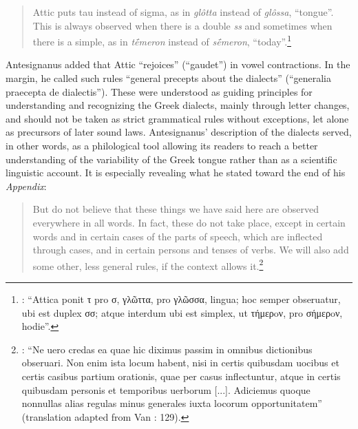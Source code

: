 \begin{quote}
Attic puts tau instead of sigma, as in \textit{glôtta} instead of \textit{glôssa}, “tongue”. This is always observed when there is a double \textit{ss} and sometimes when there is a simple, as in \textit{tḗmeron} instead of \textit{sḗmeron}, “today”.\footnote{ \textrm{\citet[13]{Antesignanus1554}: “Attica ponit τ pro σ, γλῶττα, pro γλῶσσα, lingua; hoc semper obseruatur, ubi est duplex σσ; atque interdum ubi est simplex, ut τήμερoν, pro σήμερoν, hodie”.}}
\end{quote}

Antesignanus added that Attic “rejoices” (“gaudet”) in vowel contractions. In the margin, he called such rules “general precepts about the dialects” (“generalia praecepta de dialectis”). These were understood as guiding principles for understanding and recognizing the Greek dialects, mainly through letter changes, and should not be taken as strict grammatical rules without exceptions, let alone as precursors of later sound laws. Antesignanus’ description of the dialects served, in other words, as a philological tool allowing its readers to reach a better understanding of the variability of the Greek tongue rather than as a scientific linguistic account. It is especially revealing what he stated toward the end of his \textit{Appendix}:

\begin{quote}
But do not believe that these things we have said here are observed everywhere in all words. In fact, these do not take place, except in certain words and in certain cases of the parts of speech, which are inflected through cases, and in certain persons and tenses of verbs. We will also add some other, less general rules, if the context allows it.\footnote{ \textrm{\citet[15]{Antesignanus1554}: “Ne uero credas ea quae hic diximus passim in omnibus dictionibus obseruari. Non enim ista locum habent, nisi in certis quibusdam uocibus et certis casibus partium orationis, quae per casus inflectuntur, atque in certis quibusdam personis et temporibus uerborum [...]. Adiciemus quoque nonnullas alias regulas minus generales iuxta locorum opportunitatem” (translation adapted from Van \citealt{Rooy2016c}: 129).}}
\end{quote}

